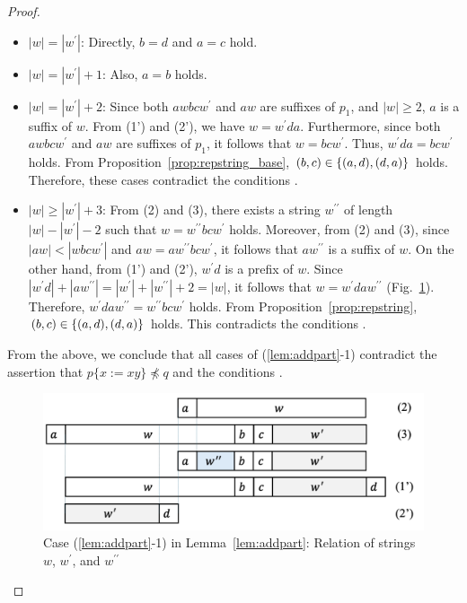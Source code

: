 \begin{proof}
  \begin{itemize}
  \item $|w|=|w^{\prime}|$: Directly, $b = d$ and $a = c$ hold.
  \item $|w|=|w^{\prime}|+1$: Also, $a = b$ holds.
  \item $|w| = |w^{\prime}|+2$: Since {\color{red}both }$awbcw^{\prime}$ and $aw$ are suffixes of $p_{1}$, and $|w|\geq 2$, $a$ is a suffix of $w$.
  From (1') and (2'), we have $w=w^{\prime}da$.
  Furthermore, since {\color{red}both }$awbcw^{\prime}$ and $aw$ are suffixes of $p_{1}$, it follows that $w=bcw^{\prime}$.
  Thus, $w^{\prime}da = bcw^{\prime}$ holds.
  From Proposition~\ref{prop:repstring_base}, $(b,c) \in \{(a,d), (d,a)\}$ holds.
  Therefore, these cases contradict the conditions \TheConditionA.
  \item $|w| \ge |w^{\prime}|+3$: From (2) and (3), there exists a string $w^{\prime\prime}$ of length $|w|-|w^{\prime}|-2$ such that $w=w^{\prime\prime}bcw^{\prime}$ holds.
  Moreover, from (2) and (3), since $|aw| < |wbcw^{\prime}|$ and $aw = aw^{\prime\prime}bcw^{\prime}$, it follows that $aw^{\prime\prime}$ is a suffix of $w$.
  On the other hand, from (1') and (2'), $w^{\prime}d$ is a prefix of $w$.
  Since $|w^{\prime}d| + |aw^{\prime\prime}| = |w^{\prime}| + |w^{\prime\prime}| + 2 = |w|$, it follows that $w=w^{\prime}daw^{\prime\prime}$ (Fig.~\ref{fig:centerproof1}).
  Therefore, $w^{\prime}daw^{\prime\prime} = w^{\prime\prime}bcw^{\prime}$ holds.
  From Proposition~\ref{prop:repstring}, $(b,c) \in \{(a,d), (d,a)\}$ holds.
  This contradicts the conditions \TheConditionA.
\end{itemize}

  From the above, we conclude that all cases of (\ref{lem:addpart}-1) contradict the assertion that $p\{x := xy\} \not\preceq q$ and the conditions \TheConditionA.
  
  \begin{figure}[t]
    \begin{center}
      \includegraphics[scale=0.345]{figs/centerproof1.pdf}
      \caption{Case (\ref{lem:addpart}-1) in Lemma~\ref{lem:addpart}: Relation of strings $w$, $w^{\prime}$, and $w^{\prime\prime}$}\label{fig:centerproof1}
    \end{center}
    \end{figure}


\end{proof}

